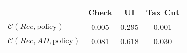 \begin{tabular}{@{}lccc@{}} 
\toprule 
                          & Check      & UI    & Tax Cut    \\  \midrule 
$\mathcal{C}(Rec,\text{policy})$ & 0.005  & 0.295  & 0.001     \\ 
$\mathcal{C}(Rec, AD,\text{policy})$ & 0.081  & 0.618  & 0.030     \\ 
\end{tabular}  
